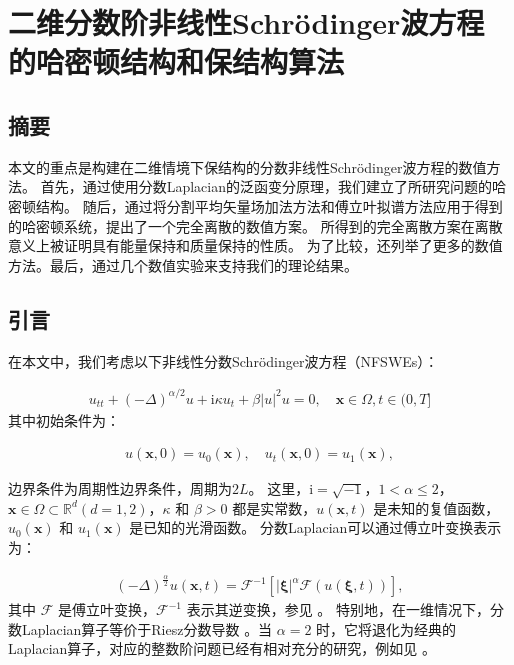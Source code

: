 \chapter[二维分数阶非线性Schr{\"o}dinger波方程的哈密顿结构和保结构算法]{二维分数阶非线性Schr{\"o}dinger波方程的哈密顿结构和保结构算法}

\section*{摘要}

本文的重点是构建在二维情境下保结构的分数非线性Schr{\"o}dinger波方程的数值方法。
首先，通过使用分数Laplacian的泛函变分原理，我们建立了所研究问题的哈密顿结构。
随后，通过将分割平均矢量场加法方法和傅立叶拟谱方法应用于得到的哈密顿系统，提出了一个完全离散的数值方案。
所得到的完全离散方案在离散意义上被证明具有能量保持和质量保持的性质。
为了比较，还列举了更多的数值方法。最后，通过几个数值实验来支持我们的理论结果。

\section{引言}\label{Section_PAVF: 1}

在本文中，我们考虑以下非线性分数Schr{\"o}dinger波方程（NFSWEs）：

\begin{align}\label{eq_PAVF:1}
u_{t t}+(-\Delta)^{\alpha / 2} u+\mathrm{i} \kappa u_{t}+\beta|u|^{2} u=0, \quad \boldsymbol{x} \in \Omega, t \in(0, T]
\end{align}
其中初始条件为：

\begin{align}\label{eq_PAVF:3}
u(\boldsymbol{x}, 0)=u_{0}(\boldsymbol{x}), \quad u_{t}(\boldsymbol{x}, 0)=u_{1}(\boldsymbol{x}),
\end{align}

边界条件为周期性边界条件，周期为$2L$。
这里，$\mathrm{i}=\sqrt{-1}$，$1<\alpha \leq 2$，$\boldsymbol{x}\in \Omega \subset \mathbb{R}^d ( d=1,2)$，$\kappa$ 和 $\beta>0$ 都是实常数，$u(\boldsymbol{x}, t)$ 是未知的复值函数，$u_{0}(\boldsymbol{x})$ 和 $u_{1}(\boldsymbol{x})$ 是已知的光滑函数。
分数Laplacian可以通过傅立叶变换表示为：

\begin{align}\label{eq_PAVF:4}
	(-\Delta)^{\frac{\alpha}{2}} u(\boldsymbol{x},t)=\mathcal{F}^{-1}\left[|\boldsymbol{\xi}|^{\alpha} \mathcal{F}(u(\boldsymbol{\xi},t))\right],
	\end{align}
其中 $\mathcal{F}$ 是傅立叶变换，$\mathcal{F}^{-1}$ 表示其逆变换，参见 \cite{caffarelliExtensionProblemRelated2007}。
特别地，在一维情况下，分数Laplacian算子等价于Riesz分数导数 \cite{yangNumericalMethodsFractional2010,demengelFunctionalSpacesTheory2012}。当 $\alpha=2$ 时，它将退化为经典的Laplacian算子，对应的整数阶问题已经有相对充分的研究，例如见 \cite{zhangConservativeNumericalScheme2003,baoUniformErrorEstimates2012,chengSeveralConservativeCompact2018,brugnanoClassEnergyconservingHamiltonian2018}。

